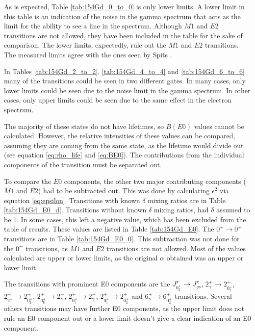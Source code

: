 \afterpage{\clearpage}

As is expected, Table \ref{tab:154Gd_0_to_0} is only lower limits. A lower limit in this table is an indication of the noise in the gamma spectrum that acts as the limit for the ability to see a line in the spectrum. Although $M1$ and $E2$ transitions are not allowed, they have been included in the table for the sake of comparison.  The lower limits, expectedly, rule out the $M1$ and $E2$ transitions. The measured limits agree with the ones seen by Spits \cite{spits96:_154gd}.

\afterpage{\clearpage}

In Tables \ref{tab:154Gd_2_to_2}, \ref{tab:154Gd_4_to_4} and \ref{tab:154Gd_6_to_6} many of the transitions could be seen in two different gates. In many cases, only lower limits could be seen due to the noise limit in the gamma spectrum.  In other cases, only upper limits could be seen due to the same effect in the electron spectrum.

\afterpage{\clearpage}

\afterpage{\clearpage}

The majority of these states do not have lifetimes, so $B(E0)$ values cannot be calculated. However, the relative intensities of these values can be compared, assuming they are coming from the same state, as the lifetime would divide out (see equation \ref{eq:rho_life} and \ref{eq:BE0}). The contributions from the individual components of the transition must be separated out.

To compare the $E0$ components, the other two major contributing components ($M1$ and $E2$) had to be subtracted out. This was done by calculating $\epsilon^2$ via equation \ref{eq:epsilon}. Transitions with known $\delta$ mixing ratios are in Table \ref{tab:154Gd_E0_d}. Transitions without known $\delta$ mixing ratios, had $\delta$ assumed to be 1. In some cases, this left a negative value, which has been excluded from the table of results. These values are listed in Table \ref{tab:154Gd_E0}. The $0^+\rightarrow0^+$ transitions are in Table \ref{tab:154Gd_E0_0}. This subtraction was not done for the $0^+$ transitions, as $M1$ and $E2$ transitions are not allowed. Most of the values calculated are upper or lower limits, as the original $\alpha$ obtained was an upper or lower limit. 

The transitions with prominent E0 components are the $J^{\pi}_{0^+_{2}}\rightarrow J^{\pi}_{gs}$, $2^{+}_{\gamma}\rightarrow 2^{+}_{0^+_{2}}$, $2^{+}_{2^{+}}\rightarrow 2^{+}_{0^+_{2}}$, $2^{+}_{0^+_{6}}\rightarrow 2^{+}_{\gamma}$, $2^{+}_{0^+_{7}}\rightarrow 2^{+}_{\gamma}$, $2^{+}_{0^+_{7}}\rightarrow 2^{+}_{0^+_{2}}$ and $6^{+}_{\gamma}\rightarrow 6^{+}_{0^+_{2}}$ transitions. Several others transitions may have further E0 components, as the upper limit does not rule an E0 component out or a lower limit doesn't give a clear indication of an E0 component.

